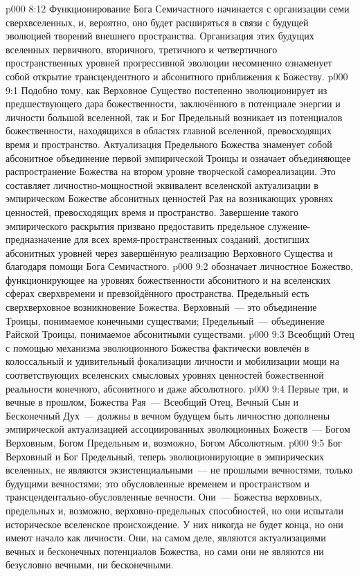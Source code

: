 \vs p000 8:12 Функционирование Бога Семичастного начинается с организации семи сверхвселенных, и, вероятно, оно будет расширяться в связи с будущей эволюцией творений внешнего пространства. Организация этих будущих вселенных первичного, вторичного, третичного и четвертичного пространственных уровней прогрессивной эволюции несомненно ознаменует собой открытие трансцендентного и абсонитного приближения к Божеству.
\vs p000 9:1 Подобно тому, как Верховное Существо постепенно эволюционирует из предшествующего дара божественности, заключённого в потенциале энергии и личности большой вселенной, так и Бог Предельный возникает из потенциалов божественности, находящихся в областях главной вселенной, превосходящих время и пространство. Актуализация Предельного Божества знаменует собой абсонитное объединение первой эмпирической Троицы и означает объединяющее распространение Божества на втором уровне творческой самореализации. Это составляет личностно\hyp{}мощностной эквивалент вселенской актуализации в эмпирическом Божестве абсонитных ценностей Рая на возникающих уровнях ценностей, превосходящих время и пространство. Завершение такого эмпирического раскрытия призвано предоставить предельное служение\hyp{}предназначение для всех время\hyp{}пространственных созданий, достигших абсонитных уровней через завершённую реализацию Верховного Существа и благодаря помощи Бога Семичастного.
\vs p000 9:2 \pc {} обозначает личностное Божество, функционирующее на уровнях божественности абсонитного и на вселенских сферах сверхвремени и превзойдённого пространства. Предельный есть сверхверховное возникновение Божества. Верховный~--- это объединение Троицы, понимаемое конечными существами; Предельный~--- объединение Райской Троицы, понимаемое абсонитными существами.
\vs p000 9:3 Всеобщий Отец с помощью механизма эволюционного Божества фактически вовлечён в колоссальный и удивительный  фокализации личности и мобилизации мощи на соответствующих вселенских смысловых уровнях ценностей божественной реальности конечного, абсонитного и даже абсолютного.
\vs p000 9:4 Первые три, и вечные в прошлом, Божества Рая~--- Всеобщий Отец, Вечный Сын и Бесконечный Дух~--- должны в вечном будущем быть личностно дополнены эмпирической актуализацией ассоциированных эволюционных Божеств~--- Богом Верховным, Богом Предельным и, возможно, Богом Абсолютным.
\vs p000 9:5 \pc Бог Верховный и Бог Предельный, теперь эволюционирующие в эмпирических вселенных, не являются экзистенциальными~--- не прошлыми вечностями, только будущими вечностями; это обусловленные временем и пространством и трансцендентально\hyp{}обусловленные вечности. Они~--- Божества верховных, предельных и, возможно, верховно\hyp{}предельных способностей, но они испытали историческое вселенское происхождение. У них никогда не будет конца, но они имеют начало как личности. Они, на самом деле, являются актуализациями вечных и бесконечных потенциалов Божества, но сами они не являются ни безусловно вечными, ни бесконечными.
